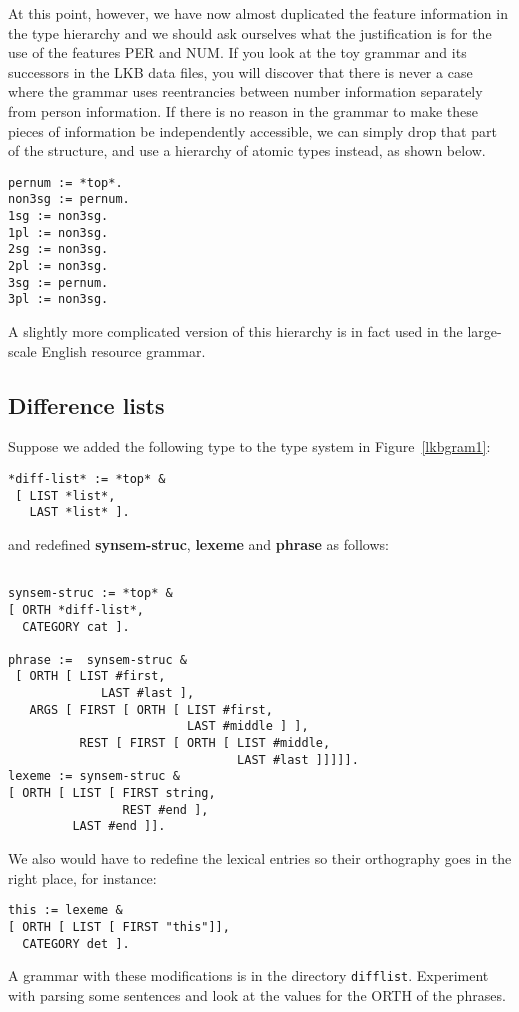 \documentclass[12pt]{report}
\begin{document}
At this point, however, we have now almost duplicated the feature information 
in the type hierarchy and
we should ask ourselves what the justification is for
the use of the features PER and NUM.  
If you look at the toy grammar and
its successors in the LKB data files, you will discover that there
is never a case where the grammar uses reentrancies between
number information
separately from person information.  
If there is no reason in the grammar
to make these pieces of information be independently
accessible, we can simply drop that part of the structure, and use a hierarchy
of atomic types instead, as shown below.
\begin{verbatim}
pernum := *top*.
non3sg := pernum.
1sg := non3sg.
1pl := non3sg.
2sg := non3sg.
2pl := non3sg.
3sg := pernum.
3pl := non3sg.
\end{verbatim}
A slightly more complicated version of this hierarchy is in fact
used in the large-scale
English resource grammar.

\subsection{Difference lists}

Suppose we added the following type to 
the type system in Figure~\ref{lkbgram1}:
\begin{verbatim}
*diff-list* := *top* &
 [ LIST *list*,
   LAST *list* ].
\end{verbatim}
and redefined {\bf synsem-struc}, {\bf lexeme} and
{\bf phrase} as follows:
\begin{verbatim}

synsem-struc := *top* &
[ ORTH *diff-list*,
  CATEGORY cat ].

phrase :=  synsem-struc &
 [ ORTH [ LIST #first,
	         LAST #last ],
   ARGS [ FIRST [ ORTH [ LIST #first,
                         LAST #middle ] ], 
          REST [ FIRST [ ORTH [ LIST #middle,
                                LAST #last ]]]]].
lexeme := synsem-struc &
[ ORTH [ LIST [ FIRST string,
                REST #end ],
         LAST #end ]].

\end{verbatim}
We also would have to
redefine the lexical entries so their orthography
goes in the right place, for instance: 
\begin{verbatim}
this := lexeme &
[ ORTH [ LIST [ FIRST "this"]],
  CATEGORY det ].
\end{verbatim}

A grammar with these modifications is in the directory {\tt difflist}.
Experiment with parsing some sentences 
and look at the values for the ORTH of the phrases.
\end{document}
